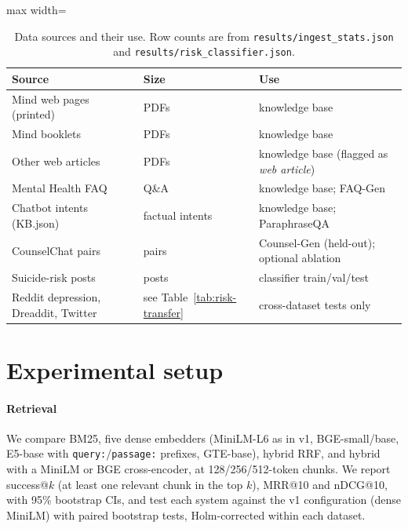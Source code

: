 \documentclass[preprint,12pt,authoryear]{elsarticle}
\begin{document}
\begin{table}[t]\centering\small
\caption{Data sources and their use. Row counts are from \texttt{results/ingest\_stats.json} and
\texttt{results/risk\_classifier.json}.}\label{tab:data}
\begin{adjustbox}{max width=\linewidth}\begin{tabular}{lll}\toprule
Source & Size & Use \\\midrule
Mind web pages (printed) & \NMindWeb{} PDFs & knowledge base \\
Mind booklets & \NMindBooklet{} PDFs & knowledge base \\
Other web articles & \NWebArticles{} PDFs & knowledge base (flagged as \emph{web article}) \\
Mental Health FAQ & \NFAQ{} Q\&A & knowledge base; FAQ-Gen \\
Chatbot intents (KB.json) & \NKBFactIntents{} factual intents & knowledge base; ParaphraseQA \\
CounselChat pairs & \NCounselRows{} pairs & Counsel-Gen (held-out); optional ablation \\
Suicide-risk posts & \NClfRows{} posts & classifier train/val/test \\
Reddit depression, Dreaddit, Twitter & see Table~\ref{tab:risk-transfer} & cross-dataset tests only \\\bottomrule
\end{tabular}\end{adjustbox}
\end{table}

\section{Experimental setup}\label{sec:setup}
\paragraph{Retrieval} We compare BM25, five dense embedders (MiniLM-L6 as in v1, BGE-small/base, E5-base with
\texttt{query:}/\texttt{passage:} prefixes, GTE-base), hybrid RRF, and hybrid with a MiniLM or BGE cross-encoder, at
128/256/512-token chunks. We report success@$k$ (at least one relevant chunk in the top $k$), MRR@10 and nDCG@10, with
95\% bootstrap CIs, and test each system against the v1 configuration (dense MiniLM) with paired bootstrap tests,
Holm-corrected within each dataset.
\end{document}
